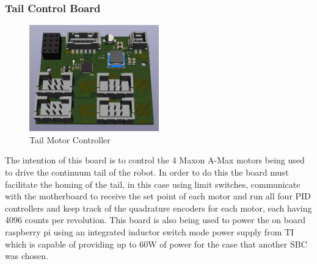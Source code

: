 \subsubsection{Tail Control Board}
\begin{figure}[H]
       \centering
       \includegraphics[width=0.5\textwidth]{figures/TailControllerBoard.png}
       \caption{Tail Motor Controller}
       \label{fig:TailControlBoardPCB}
   \end{figure}
   The intention of this board is to control the 4 Maxon A-Max motors being used to drive the continuum tail of the robot. In order to do this the board must facilitate the homing of the tail, in this case using limit switches, communicate with the motherboard to receive the set point of each motor and run all four PID controllers and keep track of the quadrature encoders for each motor, each having 4096 counts per revolution. This board is also being used to power the on board raspberry pi using an integrated inductor switch mode power supply from TI which is capable of providing up to 60W of power for the case that another SBC was chosen. 
   
